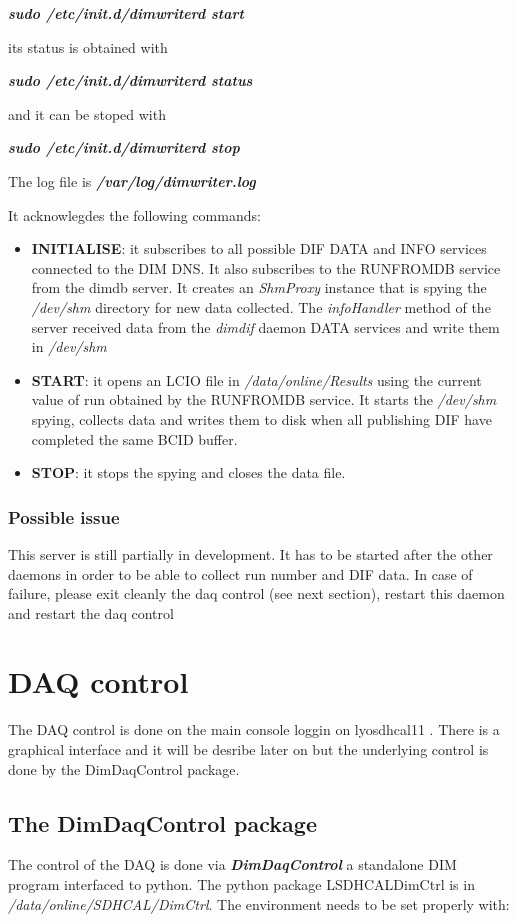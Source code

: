\documentclass[english]{article}
\begin{document}
{\sl \bf sudo /etc/init.d/dimwriterd start }

its status is obtained with 

{\sl \bf sudo /etc/init.d/dimwriterd status }

and it can be stoped with

{\sl \bf sudo /etc/init.d/dimwriterd stop }
 
 The log file is {\sl \bf /var/log/dimwriter.log }
 
 It acknowlegdes the following commands:
 \begin{itemize}
\item {\bf INITIALISE}: it subscribes to all possible DIF DATA and INFO services connected to the DIM DNS. It also subscribes to the RUNFROMDB service from the dimdb server. It creates an {\sl ShmProxy} instance that is spying the {\sl /dev/shm} directory for new data collected. The {\sl infoHandler} method of the server received data from the {\sl dimdif} daemon DATA services and write them in {\sl /dev/shm}
\item {\bf START}: it opens an LCIO file in {\sl /data/online/Results} using the current value of run obtained by the RUNFROMDB service. It starts the {\sl /dev/shm} spying, collects data and writes them to disk when all publishing DIF have completed the same BCID buffer.
\item {\bf STOP}: it stops the spying and closes the data file.
\end{itemize}

\subsubsection{Possible issue}

This server is still partially in development. It has to be started after the other daemons in order to be able
to collect run number and DIF data. In case of failure, please exit cleanly the daq control (see next section), restart this daemon and restart the daq control   

\section {DAQ control}

The DAQ control is done on the main console loggin on lyosdhcal11 . There is a graphical interface and it will be desribe later on but the underlying control is done by the DimDaqControl package.

\subsection{ The DimDaqControl package }
The control of the DAQ is done via { \bf \sl DimDaqControl } a standalone DIM program interfaced to python. The python package LSDHCALDimCtrl  is in {\sl /data/online/SDHCAL/DimCtrl}. The environment needs to be set properly with:
\end{document}
